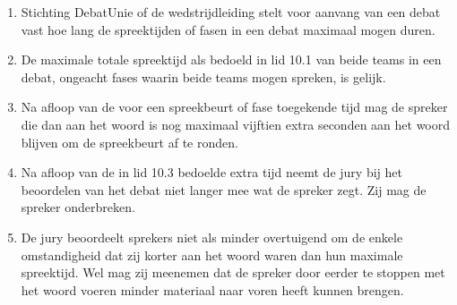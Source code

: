 
\begin{enumerate}
\item Stichting DebatUnie of de wedstrijdleiding stelt voor aanvang van een debat vast hoe lang de spreektijden of fasen in een debat maximaal mogen duren. 
\item De maximale totale spreektijd als bedoeld in lid 10.1 van beide teams in een debat, ongeacht fases waarin beide teams mogen spreken, is gelijk.
\item Na afloop van de voor een spreekbeurt of fase toegekende tijd mag de spreker die dan aan het woord is nog maximaal vijftien extra seconden aan het woord blijven om de spreekbeurt af te ronden.
\item Na afloop van de in lid 10.3 bedoelde extra tijd neemt de jury bij het beoordelen van het debat niet langer mee wat de spreker zegt. Zij mag de spreker onderbreken.
\item De jury beoordeelt sprekers niet als minder overtuigend om de enkele omstandigheid dat zij korter aan het woord waren dan hun maximale spreektijd. Wel mag zij meenemen dat de spreker door eerder te stoppen met het woord voeren minder materiaal naar voren heeft kunnen brengen.
\end{enumerate}
